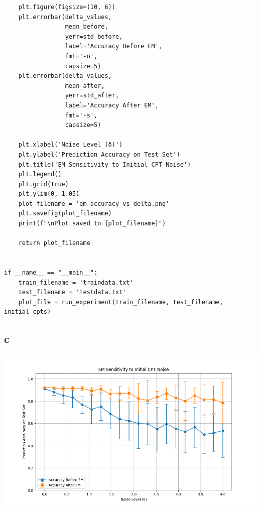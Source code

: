 \documentclass[11pt]{article}
\begin{document}
\begin{verbatim}
    plt.figure(figsize=(10, 6))
    plt.errorbar(delta_values,
                 mean_before,
                 yerr=std_before,
                 label='Accuracy Before EM',
                 fmt='-o',
                 capsize=5)
    plt.errorbar(delta_values,
                 mean_after,
                 yerr=std_after,
                 label='Accuracy After EM',
                 fmt='-s',
                 capsize=5)

    plt.xlabel('Noise Level (δ)')
    plt.ylabel('Prediction Accuracy on Test Set')
    plt.title('EM Sensitivity to Initial CPT Noise')
    plt.legend()
    plt.grid(True)
    plt.ylim(0, 1.05)
    plot_filename = 'em_accuracy_vs_delta.png'
    plt.savefig(plot_filename)
    print(f"\nPlot saved to {plot_filename}")

    return plot_filename


if __name__ == "__main__":
    train_filename = 'traindata.txt'
    test_filename = 'testdata.txt'
    plot_file = run_experiment(train_filename, test_filename, initial_cpts)
\end{verbatim}

\subsection{c}

\includegraphics[width=1.0\textwidth]{em_accuracy_vs_delta.png}
\end{document}
